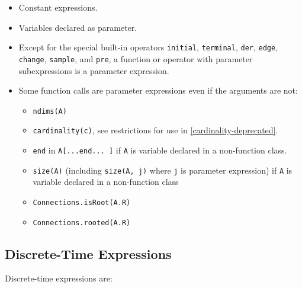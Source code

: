 \begin{itemize}
\item
  Constant expressions.
\item
  Variables declared as parameter.
\item
  Except for the special built-in operators \lstinline[basicstyle=\ttfamily]!initial!, \lstinline[basicstyle=\ttfamily]!terminal!, \lstinline[basicstyle=\ttfamily]!der!,
  \lstinline[basicstyle=\ttfamily]!edge!, \lstinline[basicstyle=\ttfamily]!change!, \lstinline[basicstyle=\ttfamily]!sample!, and \lstinline[basicstyle=\ttfamily]!pre!, a function or operator with parameter
  subexpressions is a parameter expression.
\item
  Some function calls are parameter expressions even if the arguments
  are not:

  \begin{itemize}
  \item
    \lstinline[basicstyle=\ttfamily]!ndims(A)!
  \item
    \lstinline[basicstyle=\ttfamily]!cardinality(c)!, see restrictions for use in \autoref{cardinality-deprecated}.
  \item
    \lstinline[basicstyle=\ttfamily]!end! in \lstinline[basicstyle=\ttfamily]!A[...end... ]! if \lstinline[basicstyle=\ttfamily]!A! is variable declared in a  non-function class.
  \item
    \lstinline[basicstyle=\ttfamily]!size(A)! (including \lstinline[basicstyle=\ttfamily]!size(A, j)! where \lstinline[basicstyle=\ttfamily]!j! is parameter expression) if \lstinline[basicstyle=\ttfamily]!A!
    is variable declared in a non-function class
  \item
    \lstinline[basicstyle=\ttfamily]!Connections.isRoot(A.R)!
  \item
    \lstinline[basicstyle=\ttfamily]!Connections.rooted(A.R)!
  \end{itemize}
\end{itemize}

\subsection{Discrete-Time Expressions}

Discrete-time expressions are:

